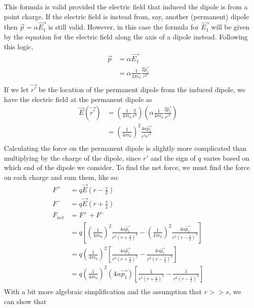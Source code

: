 \documentclass[nobib]{tufte-handout}
\begin{document}
This formula is valid provided the electric field that induced the dipole is 
from a point charge. If the electric field is instead from, say, another (permanent)
dipole then $\vec{p} = \alpha \vec{E_1}$ is still valid. However, in this case
the formula for $\vec{E_1}$ will be given by the equation for the electric field
along the axis of a dipole instead. Following this logic, 
\begin{align*}
    \vec{p} &= \alpha \vec{E_1} \\
    &= \alpha \frac{1}{4\pi \epsilon_0}\frac{2\vec{p_1}}{r^3} \\
\end{align*}
If we let $\vec{r'}$ be the location of the permanent dipole from the induced 
dipole, we have the electric field at the permanent dipole as 
\begin{align*}  
    \vec{E}(\vec{r'}) &= \left(\frac{1}{4\pi \epsilon_0}\frac{2}{r^3}\right)\left(\alpha \frac{1}{4\pi \epsilon_0}\frac{2\vec{p_1}}{r'^3}\right) \\
    &= \left(\frac{1}{4\pi \epsilon_0}\right)^2 \frac{4 \alpha \vec{p_1}}{r^3 r'^3}\\
\end{align*}
Calculating the force on the permanent dipole is slightly more complicated than
multiplying by the charge of the dipole, since $r'$ and the sign of 
$q$ varies based on which end of the dipole we consider. To find the net force, we
must find the force on each charge and sum them, like so:
\begin{align*}  
    F^+ &= q\vec{E}(r - \frac{s}{2}) \\
    F^- &= q\vec{E}(r + \frac{s}{2}) \\
    F_{net} &= F^+ + F^- \\
    &= q\left[\left(\frac{1}{4\pi \epsilon_0}\right)^2 \frac{4 \alpha \vec{p_1}}{r^3 (r + \frac{s}{2})^3} - \left(\frac{1}{4\pi \epsilon_0}\right)^2 \frac{4 \alpha \vec{p_1}}{r^3 (r - \frac{s}{2})^3}\right] \\
    &= q\left(\frac{1}{4\pi \epsilon_0}\right)^2 \left[\frac{4 \alpha \vec{p_1}}{r^3 (r + \frac{s}{2})^3} - \frac{4 \alpha \vec{p_1}}{r^3 (r - \frac{s}{2})^3}\right] \\
    &= q\left(\frac{1}{4\pi \epsilon_0}\right)^2\left(4 \alpha \vec{p_1}\right) \left[\frac{1}{r^3 (r + \frac{s}{2})^3} - \frac{1}{r^3 (r - \frac{s}{2})^3}\right] \\
\end{align*}
With a bit more algebraic simplification and the assumption
that $r >> s$, we can show that
\end{document}

